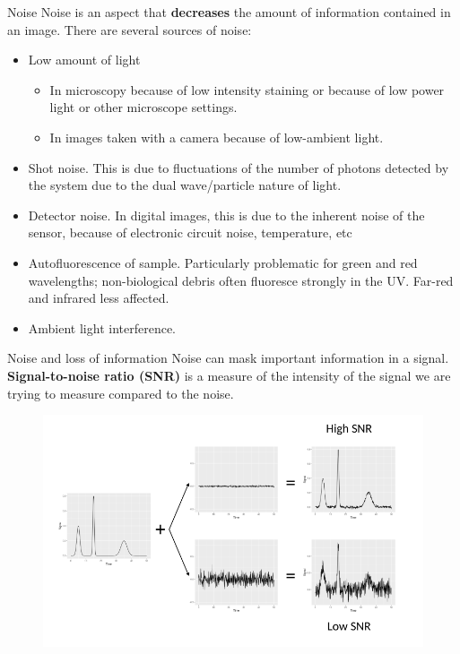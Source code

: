 \documentclass[9pt, aspectratio=169]{beamer}
\begin{document}
\begin{frame}
	{Noise}
	Noise is an aspect that \textbf{decreases} the amount of information contained in an image. There are several sources of noise:
	\begin{itemize}
		\item Low amount of light
		      \begin{itemize}
			      \item In microscopy because of low intensity staining or because of low power light or other microscope settings.
			      \item In images taken with a camera because of low-ambient light.
		      \end{itemize}
		      \pause
		\item Shot noise. This is due to fluctuations of the number of photons detected by the system due to the dual wave/particle nature of light.
		\item Detector noise. In digital images, this is due to the inherent noise of the sensor, because of electronic circuit noise, temperature, etc
		      \pause
		\item Autofluorescence of sample. Particularly problematic for green and red wavelengths; non-biological debris often fluoresce strongly in the UV. Far-red and infrared less affected.
		\item Ambient light interference.
	\end{itemize}
\end{frame}
\begin{frame}
	{Noise and loss of information}
	Noise can mask important information in a signal. \textbf{Signal-to-noise ratio (SNR)} is a measure of the intensity of the signal we are trying to measure compared to the noise.
	\begin{figure}
		\centering
		\includegraphics[width=.8\textwidth]{signal_noise.png}
	\end{figure}
\end{frame}
\end{document}

